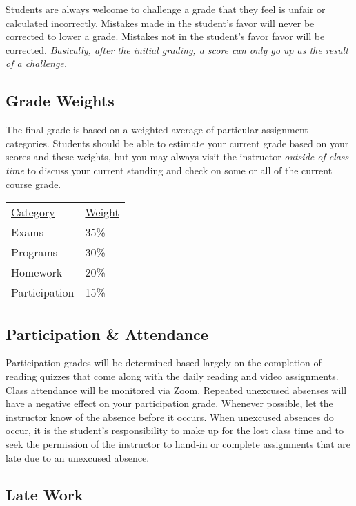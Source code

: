 \documentclass[10pt]{article}
\begin{document}
Students are always welcome to challenge a grade that they feel is unfair or calculated incorrectly.  Mistakes made in the student's favor will never be corrected to lower a grade.  Mistakes not in the student's favor favor will be corrected.  \textit{Basically, after the initial grading, a score can only go up as the result of a challenge.}



\subsection{Grade Weights}

The final grade is based on a weighted average of particular assignment categories.  Students should be able to estimate your current grade based on your scores and these weights, but you may always visit the instructor \textit{outside of class time} to discuss your current standing and check on some or all of the current course grade.

\begin{center}
  \begin{tabular}{ll}
  \underline{Category} & \underline{Weight} \\
    Exams & 35\% \\ %
    Programs & 30\% \\ %
    Homework & 20\% \\ %
    Participation & 15\%
  \end{tabular}
\end{center}

\subsection*{Participation \& Attendance}

Participation grades will be determined based largely on the completion of reading quizzes that come along
with the daily reading and video assignments. Class attendance will be monitored via Zoom. Repeated unexcused absenses will have a negative effect on your participation grade. Whenever possible, let the instructor know of the absence before it occurs. When unexcused absences do occur, it is the student's responsibility to make up for the lost class time and to seek the permission of the instructor to hand-in or complete assignments that are late due to an unexcused absence.

\subsection*{Late Work}
\end{document}
